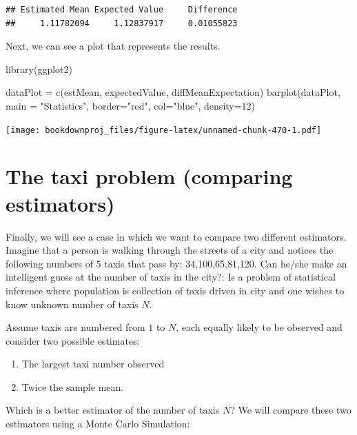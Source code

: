 \documentclass[
]{book}
\newenvironment{Shaded}{\begin{snugshade}}{\end{snugshade}}
\newcommand{\AttributeTok}[1]{\textcolor[rgb]{0.77,0.63,0.00}{#1}}
\newcommand{\DecValTok}[1]{\textcolor[rgb]{0.00,0.00,0.81}{#1}}
\newcommand{\FunctionTok}[1]{\textcolor[rgb]{0.00,0.00,0.00}{#1}}
\newcommand{\NormalTok}[1]{#1}
\newcommand{\OtherTok}[1]{\textcolor[rgb]{0.56,0.35,0.01}{#1}}
\newcommand{\StringTok}[1]{\textcolor[rgb]{0.31,0.60,0.02}{#1}}
\providecommand{\tightlist}{%
  \setlength{\itemsep}{0pt}\setlength{\parskip}{0pt}}
\theoremstyle{definition}
\theoremstyle{definition}
\theoremstyle{definition}
\theoremstyle{definition}
\theoremstyle{remark}
\begin{document}
\begin{verbatim}
## Estimated Mean Expected Value     Difference 
##     1.11782094     1.12837917     0.01055823
\end{verbatim}

Next, we can see a plot that represents the results.

\begin{Shaded}
\begin{Highlighting}[]
\FunctionTok{library}\NormalTok{(ggplot2)}

\NormalTok{dataPlot }\OtherTok{=} \FunctionTok{c}\NormalTok{(estMean, expectedValue, diffMeanExpectation)}
\FunctionTok{barplot}\NormalTok{(dataPlot, }\AttributeTok{main =} \StringTok{"Statistics"}\NormalTok{, }\AttributeTok{border=}\StringTok{"red"}\NormalTok{, }\AttributeTok{col=}\StringTok{"blue"}\NormalTok{, }\AttributeTok{density=}\DecValTok{12}\NormalTok{)}
\end{Highlighting}
\end{Shaded}

\texttt{[image: bookdownproj\_files/figure-latex/unnamed-chunk-470-1.pdf]}

\hypertarget{the-taxi-problem-comparing-estimators}{%
\section{The taxi problem (comparing estimators)}\label{the-taxi-problem-comparing-estimators}}

Finally, we will see a case in which we want to compare two different estimators. Imagine that a person is walking through the streets of a city and notices the following numbers of 5 taxis that pass by: 34,100,65,81,120. Can he/she make an intelligent guess at the number of taxis in the city?: Is a problem of statistical inference where population is collection of taxis driven in city and one wishes to know unknown number of taxis \(N\).

Assume taxis are numbered from \(1\) to \(N\), each equally likely to be observed and consider two possible estimates:

\begin{enumerate}
\def\labelenumi{\arabic{enumi}.}
\tightlist
\item
  The largest taxi number observed
\item
  Twice the sample mean.
\end{enumerate}

Which is a better estimator of the number of taxis \(N\)? We will compare these two estimators using a Monte Carlo Simulation:
\end{document}
